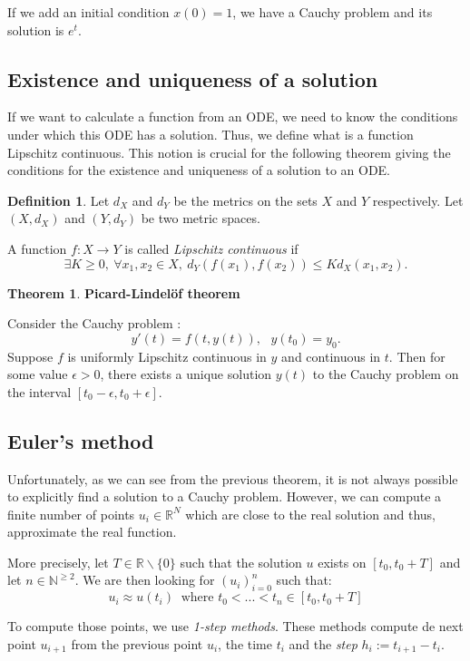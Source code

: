 \documentclass[10pt,a4paper]{article}
\theoremstyle{definition}
\newtheorem{definition}{Definition}
\theoremstyle{definition}
\newtheorem{theorem}{Theorem}
\theoremstyle{definition}
\begin{document}
If we add an initial condition $x(0) = 1$, we have a Cauchy problem and its solution is $e^t$.

\subsection{Existence and uniqueness of a solution}

If we want to calculate a function from an ODE, we need to know the conditions under which this ODE has a solution. Thus, we define what is a function Lipschitz continuous. This notion is crucial for the following theorem giving the conditions for the existence and uniqueness of a solution to an ODE. 

\begin{definition}
Let $d_X$ and $d_Y$ be the metrics on the sets $X$ and $Y$ respectively.
Let $(X, d_X)$ and $(Y, d_Y)$ be two metric spaces.  

A function $f: X \rightarrow  Y$ is called \textit{Lipschitz continuous} if
$$
\exists K \geq 0, \  \forall x_1, x_2 \in X, \  d_Y(f(x_1), f(x_2)) \leq Kd_X(x_1, x_2).
$$
\end{definition}

\begin{theorem}{\textbf{Picard-Lindelöf theorem}}

Consider the Cauchy problem :
$$
y'(t) = f(t, y(t)), \ \ \ y(t_0) = y_0.
$$
Suppose $f$ is uniformly Lipschitz continuous in $y$ and continuous in $t$. Then for some value $\epsilon > 0$, there exists a unique solution $y(t)$ to the Cauchy problem on the interval $[t_0 - \epsilon, t_0 + \epsilon]$. 
\end{theorem}

\subsection{Euler's method}
Unfortunately, as we can see from the previous theorem, it is not always possible to explicitly find a solution to a Cauchy problem. However, we can compute a finite number of points $u_i \in \mathbb{R}^N$ which are close to the real solution and thus, approximate the real function. 

More precisely, let $T \in \mathbb{R}\backslash\{0\}$ such that the solution $u$ exists on $[t_0, t_0 + T]$ and let $n \in \mathbb{N}^{\geqslant 2}$. We are then looking for $(u_i)^n_{i=0}$ such that:
$$
u_i \approx u(t_i) \ \text{ where } t_0 < ... < t_n \in [t_0, t_0 + T]
$$

To compute those points, we use \textit{1-step methods}. These methods compute de next point $u_{i+1}$ from the previous point $u_i$, the time $t_i$ and the \textit{step} $h_i := t_{i+1} - t_i$.
\end{document}
